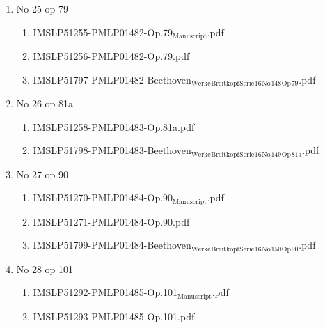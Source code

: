 \documentclass[11pt]{article}
\begin{document}
\begin{enumerate}
\begin{enumerate}
\begin{enumerate}
\item No 25 op 79
\label{sec-1-1-1-1-44-9-6-8-62}
\begin{enumerate}
\item IMSLP51255-PMLP01482-Op.79$_{\text{Manuscript}}$.pdf
\label{sec-1-1-1-1-44-9-6-8-62-1}

\item IMSLP51256-PMLP01482-Op.79.pdf
\label{sec-1-1-1-1-44-9-6-8-62-2}

\item IMSLP51797-PMLP01482-Beethoven$_{\text{Werke}}$$_{\text{Breitkopf}}$$_{\text{Serie}}$$_{\text{16}}$$_{\text{No}}$$_{\text{148}}$$_{\text{Op}}$$_{\text{79}}$.pdf
\label{sec-1-1-1-1-44-9-6-8-62-3}
\end{enumerate}

\item No 26 op 81a
\label{sec-1-1-1-1-44-9-6-8-63}
\begin{enumerate}
\item IMSLP51258-PMLP01483-Op.81a.pdf
\label{sec-1-1-1-1-44-9-6-8-63-1}

\item IMSLP51798-PMLP01483-Beethoven$_{\text{Werke}}$$_{\text{Breitkopf}}$$_{\text{Serie}}$$_{\text{16}}$$_{\text{No}}$$_{\text{149}}$$_{\text{Op}}$$_{\text{81a}}$.pdf
\label{sec-1-1-1-1-44-9-6-8-63-2}
\end{enumerate}

\item No 27 op 90
\label{sec-1-1-1-1-44-9-6-8-64}
\begin{enumerate}
\item IMSLP51270-PMLP01484-Op.90$_{\text{Manuscript}}$.pdf
\label{sec-1-1-1-1-44-9-6-8-64-1}

\item IMSLP51271-PMLP01484-Op.90.pdf
\label{sec-1-1-1-1-44-9-6-8-64-2}

\item IMSLP51799-PMLP01484-Beethoven$_{\text{Werke}}$$_{\text{Breitkopf}}$$_{\text{Serie}}$$_{\text{16}}$$_{\text{No}}$$_{\text{150}}$$_{\text{Op}}$$_{\text{90}}$.pdf
\label{sec-1-1-1-1-44-9-6-8-64-3}
\end{enumerate}

\item No 28 op 101
\label{sec-1-1-1-1-44-9-6-8-65}
\begin{enumerate}
\item IMSLP51292-PMLP01485-Op.101$_{\text{Manuscript}}$.pdf
\label{sec-1-1-1-1-44-9-6-8-65-1}

\item IMSLP51293-PMLP01485-Op.101.pdf
\label{sec-1-1-1-1-44-9-6-8-65-2}


\end{enumerate}
\end{enumerate}
\end{enumerate}
\end{enumerate}
\end{document}
